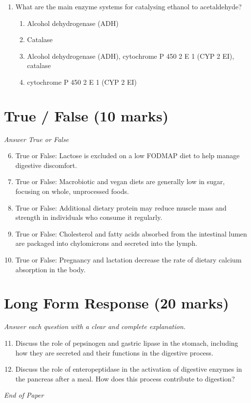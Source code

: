 \documentclass[12pt]{article}
\begin{document}
\begin{enumerate}[label=\arabic*.]
\begin{enumerate}[label=(\alph*)]
    \item A reduction in bone density
    \item An increased appetite
    \item Impaired immune function
\end{enumerate}
\item What are the main enzyme systems for catalysing ethanol to acetaldehyde?
\begin{enumerate}[label=(\alph*)]
    \item Alcohol dehydrogenase (ADH)
    \item Catalase
    \item Alcohol dehydrogenase (ADH), cytochrome P 450 2 E 1 (CYP 2 EI), catalase
    \item cytochrome P 450 2 E 1 (CYP 2 EI)
\end{enumerate}
\end{enumerate}

\section*{True / False (10 marks)}
\textit{Answer True or False}
\begin{enumerate}[label=\arabic*.]
\setcounter{enumi}{5}
\item True or False: Lactose is excluded on a low FODMAP diet to help manage digestive discomfort.
\item True or False: Macrobiotic and vegan diets are generally low in sugar, focusing on whole, unprocessed foods.
\item True or False: Additional dietary protein may reduce muscle mass and strength in individuals who consume it regularly.
\item True or False: Cholesterol and fatty acids absorbed from the intestinal lumen are packaged into chylomicrons and secreted into the lymph.
\item True or False: Pregnancy and lactation decrease the rate of dietary calcium absorption in the body.
\end{enumerate}

\section*{Long Form Response (20 marks)}
\textit{Answer each question with a clear and complete explanation.}
\begin{enumerate}[label=\arabic*.]
\setcounter{enumi}{10}
\item Discuss the role of pepsinogen and gastric lipase in the stomach, including how they are secreted and their functions in the digestive process.
\item Discuss the role of enteropeptidase in the activation of digestive enzymes in the pancreas after a meal. How does this process contribute to digestion?
\end{enumerate}

\vfill
\noindent\textit{End of Paper}
\end{document}

